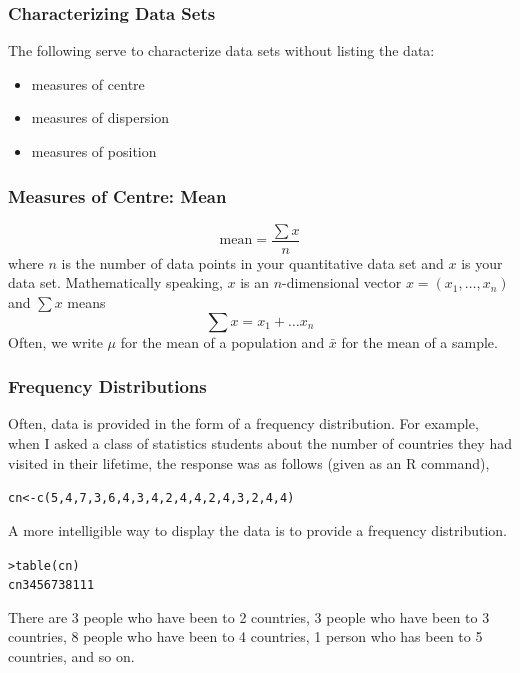 \documentclass[xcolor=dvipsnames]{beamer}
\begin{document}
\begin{frame}
  \frametitle{Characterizing Data Sets}
  The following serve to characterize data sets without listing the
  data:
  \begin{itemize}
  \item measures of centre
  \item measures of dispersion
  \item measures of position
  \end{itemize}
\end{frame}

\begin{frame}
  \frametitle{Measures of Centre: Mean}
  \begin{equation}
    \label{eq:daechuev}
    \mbox{mean}=\frac{\sum{}x}{n}
  \end{equation}
  where $n$ is the number of data points in your quantitative data set
  and $x$ is your data set. Mathematically speaking, $x$ is an
  $n$-dimensional vector $x=(x_{1},{\ldots},x_{n})$ and $\sum{}x$
  means
  \begin{equation}
    \label{eq:aethecux}
    \sum{}x=x_{1}+{\ldots}x_{n}
  \end{equation}
Often, we write $\mu$ for the mean of a
  population and $\bar{x}$ for the mean of a sample.
\end{frame}

\begin{frame}
  \frametitle{Frequency Distributions}
Often, data is provided in the form of a frequency distribution. For
example, when I asked a class of statistics students about the number
of countries they had visited in their lifetime, the response was as
follows (given as an R command),
\begin{alltt}
\small
cn<-c(5,4,7,3,6,4,3,4,2,4,4,2,4,3,2,4,4)
\end{alltt}
A more intelligible way to display the data is to provide a frequency
distribution.
\begin{alltt}
> table(cn)\newline
cn 3 4 5 6 7  3 8 1 1 1
\end{alltt}
There are 3 people who have been to 2 countries, 3 people who have
been to 3 countries, 8 people who have been to 4 countries, 1 person
who has been to 5 countries, and so on.
\end{frame}
\end{document}
